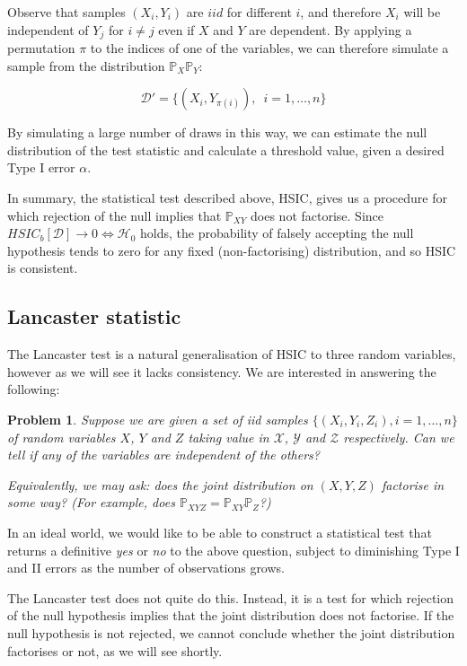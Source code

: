 \documentclass[12pt]{article}
\newtheorem{problem}{Problem}
\numberwithin{claim}{section}
\numberwithin{lemma}{section}
\numberwithin{theorem}{section}
\begin{document}
Observe that samples $(X_i,Y_i)$ are $iid$ for different $i$, and therefore $X_i$ will be independent of $Y_j$ for $i\neq j$ even if $X$ and $Y$ are dependent. By applying a permutation $\pi$ to the indices of one of the variables, we can therefore simulate a sample from the distribution $\mathbb{P}_{X}\mathbb{P}_{Y}$:

\[\mathcal{D}' = \{(X_i,Y_{\pi(i)}),\enspace i=1,\ldots,n \} \]

By simulating a large number of draws in this way, we can estimate the null distribution of the test statistic and calculate a threshold value, given a desired Type I error $\alpha$. 


In summary, the statistical test described above, HSIC, gives us a procedure for which rejection of the null implies that $\mathbb{P}_{XY}$ does not factorise. Since $HSIC_b[\mathcal{D}] \longrightarrow 0 \iff \mathcal{H}_0$ holds, the probability of falsely accepting the null hypothesis tends to zero for any fixed (non-factorising) distribution, and so HSIC is consistent.


\subsection{Lancaster statistic}

The Lancaster test is a natural generalisation of HSIC to three random variables, however as we will see it lacks consistency. We are interested in answering the following:

\begin{problem}
Suppose we are given a set of \emph{iid} samples $\{(X_i,Y_i,Z_i), i=1,\ldots,n\}$ of random variables $X$, $Y$ and $Z$ taking value in $\mathcal{X}$, $\mathcal{Y}$ and $\mathcal{Z}$ respectively. Can we tell if any of the variables are independent of the others? 

Equivalently, we may ask: does the joint distribution on $(X,Y,Z)$ factorise in some way? (For example, does $\mathbb{P}_{XYZ} = \mathbb{P}_{XY}\mathbb{P}_{Z}$?)
\end{problem}

In an ideal world, we would like to be able to construct a statistical test that returns a definitive \emph{yes} or \emph{no} to the above question, subject to diminishing Type I and II errors as the number of observations grows.

The Lancaster test does not quite do this. Instead, it is a test for which rejection of the null hypothesis implies that the joint distribution does not factorise. If the null hypothesis is not rejected, we cannot conclude whether the joint distribution factorises or not, as we will see shortly.
\end{document}
